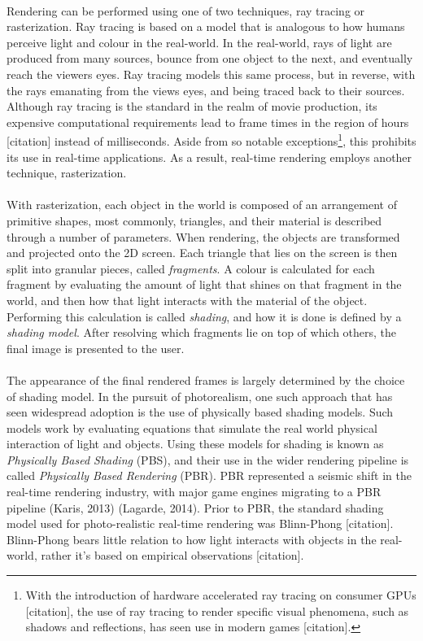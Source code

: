 \paragraph{}Rendering can be performed using one of two techniques, ray tracing or rasterization. Ray tracing is based on a model that is analogous to how humans perceive light and colour in the real-world. In the real-world, rays of light are produced from many sources, bounce from one object to the next, and eventually reach the viewers eyes. Ray tracing models this same process, but in reverse, with the rays emanating from the views eyes, and being traced back to their sources. Although ray tracing is the standard in the realm of movie production, its expensive computational requirements lead to frame times in the region of hours [citation] instead of milliseconds. Aside from so notable exceptions\footnote{With the introduction of hardware accelerated ray tracing on consumer GPUs [citation], the use of ray tracing to render specific visual phenomena, such as shadows and reflections, has seen use in modern games [citation].}, this prohibits its use in real-time applications. As a result, real-time rendering employs another technique, rasterization.

\paragraph{}With rasterization, each object in the world is composed of an arrangement of primitive shapes, most commonly, triangles, and their material is described through a number of parameters. When rendering, the objects are transformed and projected onto the 2D screen. Each triangle that lies on the screen is then split into granular pieces, called \textit{fragments}. A colour is calculated for each fragment by evaluating the amount of light that shines on that fragment in the world, and then how that light interacts with the material of the object. Performing this calculation is called \textit{shading}, and how it is done is defined by a \textit{shading model}. After resolving which fragments lie on top of which others, the final image is presented to the user.

\paragraph{}The appearance of the final rendered frames is largely determined by the choice of shading model. In the pursuit of photorealism, one such approach that has seen widespread adoption is the use of physically based shading models. Such models work by evaluating equations that simulate the real world physical interaction of light and objects. Using these models for shading is known as \textit{Physically Based Shading} (PBS), and their use in the wider rendering pipeline is called \textit{Physically Based Rendering} (PBR). PBR represented a seismic shift in the real-time rendering industry, with major game engines migrating to a PBR pipeline (Karis, 2013) (Lagarde, 2014). Prior to PBR, the standard shading model used for photo-realistic real-time rendering was Blinn-Phong [citation]. Blinn-Phong bears little relation to how light interacts with objects in the real-world, rather it’s based on empirical observations [citation].


